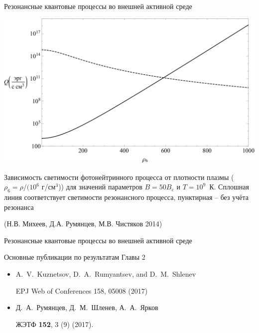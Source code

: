 \documentclass{beamer}
\begin{document}
\begin{frame}{Резонансные квантовые процессы во внешней активной среде}
\begin{center}
\includegraphics[scale=0.3]{Qsyn-Qpn 1.pdf}

Зависимость светимости фотонейтринного процесса от плотности плазмы ($\rho_6 = \rho /(10^6$ г/см$^3$)) для значений параметров 
$B=50 B_e$ и $T=10^9$~К. Сплошная линия соответствует светимости резонансного процесса, пунктирная -- без учёта резонанса

(Н.В. Михеев, Д.А. Румянцев, М.В. Чистяков 2014)
\end{center}
\end{frame}
\begin{frame}{Резонансные квантовые процессы во внешней активной среде}

\begin{center}
Основные публикации по результатам Главы 2
\end{center}
% 
\begin{itemize}
%
\item
   A.~V.~Kuznetsov, D.~A.~Rumyantsev, and  D.~M.~Shlenev
 
   EPJ Web of Conferences 158, 05008 (2017)
% 
\item
   Д.~А.~Румянцев, Д.~М.~Шленев, А.~А.~Ярков

   ЖЭТФ {\bf 152}, 3 (9) (2017).
\end{itemize}
\end{frame}
\end{document}
